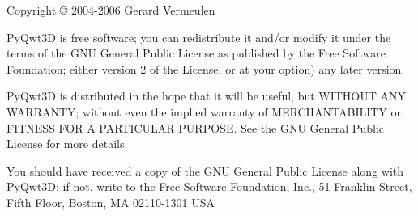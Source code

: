 Copyright \copyright{} 2004-2006 Gerard Vermeulen

PyQwt3D is free software; you can redistribute it and/or modify
it under the terms of the GNU General Public License as published by
the Free Software Foundation; either version 2 of the License, or
at your option) any later version.

PyQwt3D is distributed in the hope that it will be useful,
but WITHOUT ANY WARRANTY; without even the implied warranty of
MERCHANTABILITY or FITNESS FOR A PARTICULAR PURPOSE.  See the
GNU General Public License for more details.

You should have received a copy of the GNU General Public License along
with PyQwt3D; if not, write to the Free Software Foundation, Inc.,
51 Franklin Street, Fifth Floor, Boston, MA  02110-1301  USA
